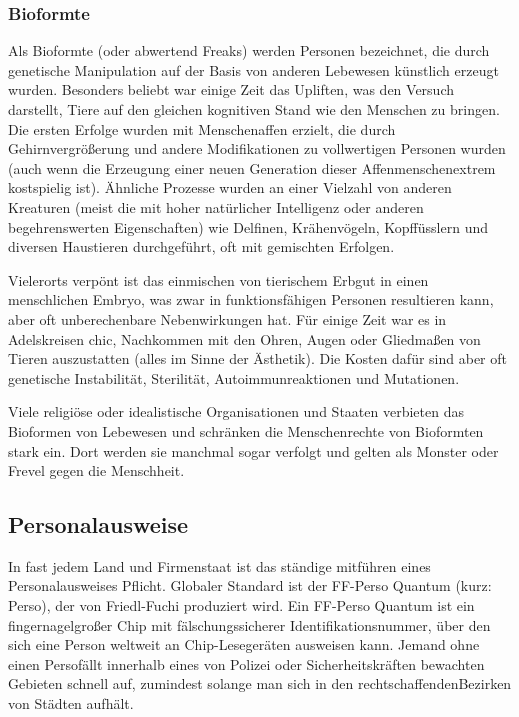 \subsubsection{Bioformte}
Als Bioformte (oder abwertend \glqq Freaks\grqq) werden Personen bezeichnet, die durch genetische Manipulation auf der Basis von anderen Lebewesen künstlich erzeugt wurden. Besonders beliebt war einige Zeit das \glqq Upliften\grqq, was den Versuch darstellt, Tiere auf den gleichen kognitiven Stand wie den Menschen zu bringen. Die ersten Erfolge wurden mit Menschenaffen erzielt, die durch Gehirnvergrößerung und andere Modifikationen zu vollwertigen Personen wurden (auch wenn die Erzeugung einer neuen Generation dieser \glqq Affenmenschen\grqq{}extrem kostspielig ist). Ähnliche Prozesse wurden an einer Vielzahl von anderen Kreaturen (meist die mit hoher natürlicher Intelligenz oder anderen begehrenswerten Eigenschaften) wie Delfinen, Krähenvögeln, Kopffüsslern und diversen Haustieren durchgeführt, oft mit gemischten Erfolgen.

Vielerorts verpönt ist das einmischen von tierischem Erbgut in einen menschlichen Embryo, was zwar in \glqq funktionsfähigen\grqq{} Personen resultieren kann, aber oft unberechenbare Nebenwirkungen hat. Für einige Zeit war es in Adelskreisen \glqq chic\grqq{}, Nachkommen mit den Ohren, Augen oder Gliedmaßen von Tieren auszustatten (alles im Sinne der Ästhetik). Die Kosten dafür sind aber oft genetische Instabilität, Sterilität, Autoimmunreaktionen und Mutationen.

Viele religiöse oder idealistische Organisationen und Staaten verbieten das Bioformen von Lebewesen und schränken die Menschenrechte von Bioformten stark ein. Dort werden sie manchmal sogar verfolgt und gelten als Monster oder Frevel gegen die Menschheit.

\subsection{Personalausweise}
In fast jedem Land und Firmenstaat ist das ständige mitführen eines Personalausweises Pflicht. Globaler Standard ist der FF-Perso Quantum (kurz: Perso), der von Friedl-Fuchi produziert wird. Ein FF-Perso Quantum ist ein fingernagelgroßer Chip mit fälschungssicherer Identifikationsnummer, über den sich eine Person weltweit an Chip-Lesegeräten ausweisen kann. Jemand ohne einen \glqq Perso\grqq{}fällt innerhalb eines von Polizei oder Sicherheitskräften bewachten Gebieten schnell auf, zumindest solange man sich in den \glqq rechtschaffenden\grqq{}Bezirken von Städten aufhält.

